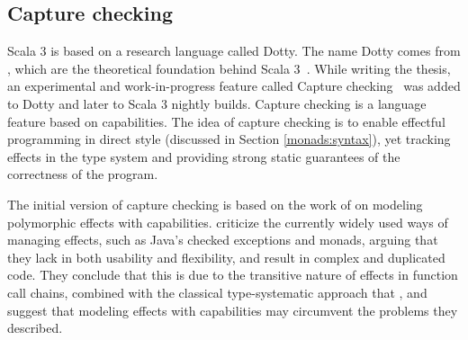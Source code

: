 



\subsection{Capture checking}
Scala 3 is based on a research language called Dotty. The name Dotty comes from , which are the theoretical foundation behind Scala 3~\cite{essence-of-dot}. While writing the thesis, an experimental and work-in-progress feature called Capture checking~\cite{capture-checking} was added to Dotty and later to Scala 3 nightly builds. Capture checking is a language feature based on capabilities. The idea of capture checking is to enable effectful programming in direct style (discussed in Section \ref{monads:syntax}), yet tracking effects in the type system and providing strong static guarantees of the correctness of the program.

The initial version of capture checking is based on the work of \textcite{scoped-capabilities} on modeling polymorphic effects with capabilities. \citeauthor{scoped-capabilities} criticize the currently widely used ways of managing effects, such as Java's checked exceptions and monads, arguing that they lack in both usability and flexibility, and result in complex and duplicated code. They conclude that this is due to the transitive nature of effects in function call chains, combined with the classical type-systematic approach that , and suggest that modeling effects with capabilities may circumvent the problems they described.

